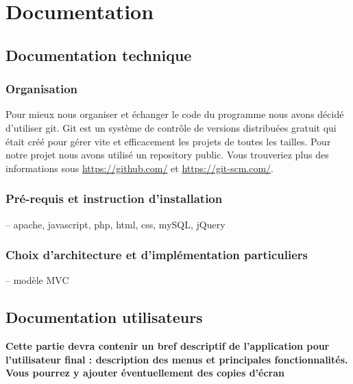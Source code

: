 \documentclass[a4paper,12pt,abstracton,titlepage]{scrartcl}
\begin{document}
\newpage
\section{Documentation}
\subsection{Documentation technique}
\subsubsection{Organisation}
Pour mieux nous organiser et échanger le code du programme nous avons décidé d'utiliser git. Git est un système de contrôle de versions distribuées gratuit qui était créé pour gérer vite et efficacement les projets de toutes les tailles. Pour notre projet nous avons utilisé un repository public.
Vous trouveriez plus des informations sous \url{https://github.com/} et \url{https://git-scm.com/}.
\subsubsection{Pré-requis et instruction d'installation}
-- apache, javascript, php, html, css, mySQL, jQuery

\subsubsection{Choix d'architecture et d'implémentation particuliers}
-- modèle MVC

\subsection{Documentation utilisateurs}
\textbf{Cette partie devra contenir un bref descriptif de l'application pour l'utilisateur final : description des menus et principales fonctionnalités. Vous pourrez y ajouter éventuellement des copies d'écran}\\
\end{document}
